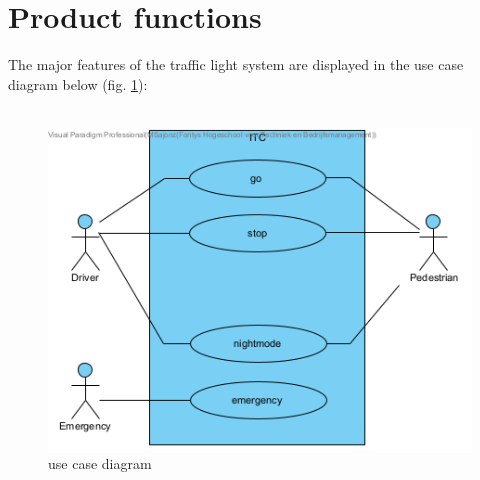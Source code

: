 \documentclass[a4paper]{report}
\begin{document}
\section{Product functions}
The major features of the traffic light system are displayed in the use case diagram below (fig. \ref{fig:useCaseDiagram}):\\\\
\begin{figure}[H]
    \centering
    \includegraphics[scale=0.75]{Use_case_diagram}
    \caption{use case diagram}
    \label{fig:useCaseDiagram}
\end{figure}
\end{document}
